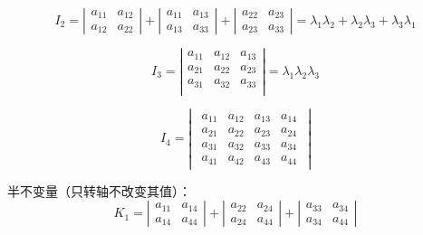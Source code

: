 \begin{equation}
I_2=
\left| 
\begin{array}{cc}
a_{11} & a_{12} \\
a_{12} & a_{22} 
\end{array}
\right| 
+
\left| 
\begin{array}{cc}
a_{11} & a_{13} \\
a_{13} & a_{33} 
\end{array}
\right| 
+
\left| 
\begin{array}{cc}
a_{22} & a_{23} \\
a_{23} & a_{33}
\end{array}
\right| 
= \lambda_1\lambda_2 +\lambda_2\lambda_3 +\lambda_3\lambda_1
\end{equation}

\begin{equation}
I_3=
\left| 
\begin{array}{ccc}
a_{11} & a_{12} & a_{13}  \\
a_{21} & a_{22} & a_{23}  \\
a_{31} & a_{32} & a_{33}  \\
\end{array}
\right| 
= \lambda_1\lambda_2\lambda_3
\end{equation}

\begin{equation}
I_4=
\left| 
\begin{array}{ccc}
\begin{array}{cccc}
a_{11} & a_{12} & a_{13} & a_{14} \\
a_{21} & a_{22} & a_{23} & a_{24} \\
a_{31} & a_{32} & a_{33} & a_{34} \\
a_{41} & a_{42} & a_{43} & a_{44}
\end{array}
\end{array}
\right| 
\end{equation}

\par 半不变量（只转轴不改变其值）：
\begin{equation}
K_1=
\left| 
\begin{array}{cc}
a_{11} & a_{14} \\
a_{14} & a_{44} 
\end{array}
\right| 
+
\left| 
\begin{array}{cc}
a_{22} & a_{24} \\
a_{24} & a_{44} 
\end{array}
\right| 
+
\left| 
\begin{array}{cc}
a_{33} & a_{34} \\
a_{34} & a_{44}
\end{array}
\right| 
\end{equation}

